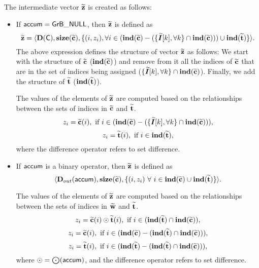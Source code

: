 The intermediate vector ${\bf \widetilde{z}}$ is created as follows:
\begin{itemize}
    \item If ${\sf accum} = {\sf GrB\_NULL}$, then ${\bf \widetilde{z}}$ is defined as 
    \[ 
        {\bf \widetilde{z}} =
		\langle \bold{D}({\sf C}), \bold{size}({\bf \widetilde{c}}), 
		\{(i,z_{i}), \forall i \in (\bold{ind}({\bf \widetilde{c}})-(\{\bm{\widetilde{I}}[k],\forall k\} \cap \bold{ind}({\bf \widetilde{c}}))) \cup 
        \bold{ind}({\bf \widetilde{t}}) \} \rangle.
    \]
    The above expression defines the structure of vector ${\bf \widetilde{z}}$ as follows:
    We start with the structure of ${\bf \widetilde{c}}$ ($\bold{ind}({\bf \widetilde{c}})$) and remove from 
    it all the indices of ${\bf \widetilde{c}}$ that are
    in the set of indices being assigned ($\{\bm{\widetilde{I}}[k],\forall k\} \cap \bold{ind}({\bf \widetilde{c}})$). Finally, we
    add the structure of ${\bf \widetilde{t}}$ ($\bold{ind}({\bf \widetilde{t}})$).

    The values of the elements of ${\bf \widetilde{z}}$ are computed based on the 
    relationships between the sets of indices in ${\bf \widetilde{c}}$ 
    and ${\bf \widetilde{t}}$.
    \[
        z_{i} = \vector{\widetilde{c}}(i), \ \mbox{if}\  i \in  
        (\bold{ind}(\vector{\widetilde{c}}) - (\{\grbarray{\widetilde{I}}[k],\forall k\}
        \cap \bold{ind}(\vector{\widetilde{c}}))),
    \]
    \[
        z_{i} = \vector{\widetilde{t}}(i), \ \mbox{if}\  i \in  
        \bold{ind}(\vector{\widetilde{t}}),
    \]
    where the difference operator refers to set difference.

    \item If ${\sf accum}$ is a binary operator, then ${\bf \widetilde{z}}$ is defined as
        \[ \langle \mbox{$\mathbf{D}_{out}$}({\sf accum}), \bold{size}({\bf \widetilde{c}}),
        \{(i,z_{i}) \ \forall \ i \in \bold{ind}({\bf \widetilde{c}}) \cup 
        \bold{ind}({\bf \widetilde{t}}) \} \rangle.\]

    The values of the elements of ${\bf \widetilde{z}}$ are computed based on the 
    relationships between the sets of indices in ${\bf \widetilde{w}}$ and 
    ${\bf \widetilde{t}}$.
\[
    z_{i} = {\bf \widetilde{c}}(i) \odot {\bf \widetilde{t}}(i), \ \mbox{if}\  
    i \in  (\bold{ind}({\bf \widetilde{t}}) \cap \bold{ind}({\bf \widetilde{c}})),
\]
\[
    z_{i} = \vector{\widetilde{c}}(i), \ \mbox{if}\ 
    i \in  (\bold{ind}(\vector{\widetilde{c}}) - (\bold{ind}(\vector{\widetilde{t}})
    \cap \bold{ind}(\vector{\widetilde{c}}))),
\]
\[
    z_{i} = \vector{\widetilde{t}}(i), \ \mbox{if}\  i \in  
    (\bold{ind}(\vector{\widetilde{t}}) - (\bold{ind}(\vector{\widetilde{t}})
    \cap \bold{ind}(\vector{\widetilde{c}}))),
\]
where $\odot  = \bigodot({\sf accum})$, and the difference operator refers to set difference.
\end{itemize}

